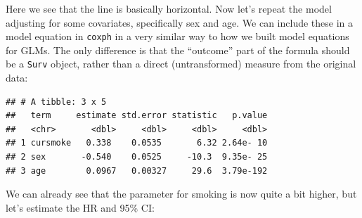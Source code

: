 \documentclass[
]{book}
\newenvironment{Shaded}{\begin{snugshade}}{\end{snugshade}}
\newcommand{\DataTypeTok}[1]{\textcolor[rgb]{0.13,0.29,0.53}{#1}}
\newcommand{\FloatTok}[1]{\textcolor[rgb]{0.00,0.00,0.81}{#1}}
\newcommand{\KeywordTok}[1]{\textcolor[rgb]{0.13,0.29,0.53}{\textbf{#1}}}
\newcommand{\NormalTok}[1]{#1}
\newcommand{\OperatorTok}[1]{\textcolor[rgb]{0.81,0.36,0.00}{\textbf{#1}}}
\newcommand{\StringTok}[1]{\textcolor[rgb]{0.31,0.60,0.02}{#1}}
\begin{document}
Here we see that the line is basically horizontal. Now let's repeat the model adjusting for some covariates, specifically sex and age. We can include these in a model equation in \texttt{coxph} in a very similar way to how we built model equations for GLMs. The only difference is that the ``outcome'' part of the formula should be a \texttt{Surv} object, rather than a direct (untransformed) measure from the original data:

\begin{Shaded}
\end{Shaded}

\begin{verbatim}
## # A tibble: 3 x 5
##   term     estimate std.error statistic   p.value
##   <chr>       <dbl>     <dbl>     <dbl>     <dbl>
## 1 cursmoke   0.338    0.0535       6.32 2.64e- 10
## 2 sex       -0.540    0.0525     -10.3  9.35e- 25
## 3 age        0.0967   0.00327     29.6  3.79e-192
\end{verbatim}

We can already see that the parameter for smoking is now quite a bit higher, but let's estimate the HR and 95\% CI:

\begin{Shaded}
\end{Shaded}
\end{document}
